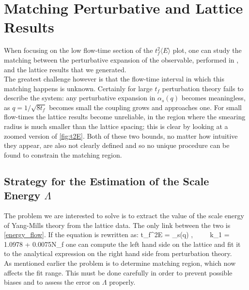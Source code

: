\section{Matching Perturbative and Lattice Results}
When focusing on the low flow-time section of the $t_f^2\langle E \rangle$ plot, one can study the matching between the perturbative expansion of the observable, performed in \cite{luscher_properties_2010}, and the lattice results that we generated. \\
The greatest challenge however is that the flow-time interval in which this matching happens is unknown. Certainly for large $t_f$ perturbation theory fails to describe the system: any perturbative expansion in $\alpha_s(q)$ becomes meaningless, as $q=1/\sqrt{8t_f}$ becomes small the coupling grows and approaches one. For small flow-times the lattice results become unreliable, in the region where the smearing radius is much smaller than the lattice spacing; this is clear by looking at a zoomed version of \cref{fig:t2E}. Both of these two bounds, no matter how intuitive they appear, are also not clearly defined and so no unique procedure can be found to constrain the matching region.

\subsection{Strategy for the Estimation of the Scale Energy $\Lambda$}
The problem we are interested to solve is to extract the value of the scale energy of Yang-Mills theory from the lattice data. The only link between the two is \cref{energy_flow}. If the equation is rewritten as:
\beq
t_f^2\langle E \rangle =  \alpha_s(q) ,~~~~~k_1 = 1.0978 + 0.0075\times N_f
    \label{energy_flow}
\eeq  
one can compute the left hand side on the lattice and fit it to the analytical expression on the right hand side from perturbation theory. \\
As mentioned earlier the problem is to determine matching region, which now affects the fit range. This must be done carefully in order to prevent possible biases and to assess the error on $\Lambda$ properly. 